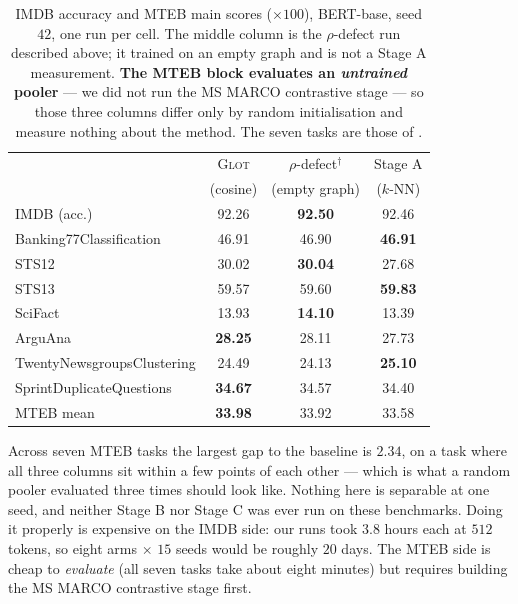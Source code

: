 \documentclass{article}
\begin{document}
\begin{table}[h]
\caption{IMDB accuracy and MTEB main scores ($\times 100$), BERT-base, seed $42$,
one run per cell. The middle column is the $\rho$-defect run described above; it
trained on an empty graph and is not a Stage A measurement. \textbf{The MTEB
block evaluates an \emph{untrained} pooler} --- we did not run the MS MARCO
contrastive stage --- so those three columns differ only by random
initialisation and measure nothing about the method. The seven tasks are those
of \citet{mantri2026glot}.}
\label{tab:docmteb}
\begin{center}
\small
\begin{tabular}{lccc}
\toprule
 & \textsc{Glot} & $\rho$-defect$^{\dagger}$ & Stage A \\
 & (cosine) & (empty graph) & ($k$-NN) \\
\midrule
IMDB (acc.) & 92.26 & \textbf{92.50} & 92.46 \\
\midrule
Banking77Classification    & 46.91 & 46.90 & \textbf{46.91} \\
STS12                      & 30.02 & \textbf{30.04} & 27.68 \\
STS13                      & 59.57 & 59.60 & \textbf{59.83} \\
SciFact                    & 13.93 & \textbf{14.10} & 13.39 \\
ArguAna                    & \textbf{28.25} & 28.11 & 27.73 \\
TwentyNewsgroupsClustering & 24.49 & 24.13 & \textbf{25.10} \\
SprintDuplicateQuestions   & \textbf{34.67} & 34.57 & 34.40 \\
\midrule
MTEB mean                  & \textbf{33.98} & 33.92 & 33.58 \\
\bottomrule
\end{tabular}
\end{center}
\end{table}

Across seven MTEB tasks the largest gap to the baseline is $2.34$, on a task
where all three columns sit within a few points of each other --- which is what
a random pooler evaluated three times should look like. Nothing here is
separable at one seed, and neither Stage B nor Stage C was ever run on these
benchmarks. Doing it properly is expensive on the IMDB side: our runs took $3.8$
hours each at $512$ tokens, so eight arms $\times$ $15$ seeds would be roughly
$20$ days. The MTEB side is cheap to \emph{evaluate} (all seven tasks take about
eight minutes) but requires building the MS MARCO contrastive stage first.
\end{document}
